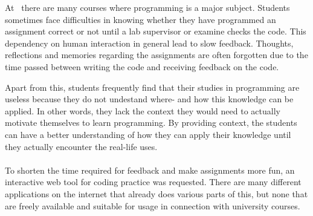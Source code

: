 At \LTU\ there are many courses where programming is a major subject. Students sometimes face difficulties in knowing whether they have programmed an assignment correct or not until a lab supervisor or examine checks the code. This dependency on human interaction in general lead to slow feedback. Thoughts, reflections and memories regarding the assignments are often forgotten due to the time passed between writing the code and receiving feedback on the code.

Apart from this, students frequently find that their studies in programming are useless because they do not undestand where- and how this knowledge can be applied. In other words, they lack the context they would need to actually motivate themselves to learn programming. By providing context, the students can have a better understanding of how they can apply their knowledge until they actually encounter the real-life uses.\\
\\
To shorten the time required for feedback and make assignments more fun, an interactive web tool for coding practice was requested. There are many different applications on the internet that already does various parts of this, but none that are freely available and suitable for usage in connection with university courses.

